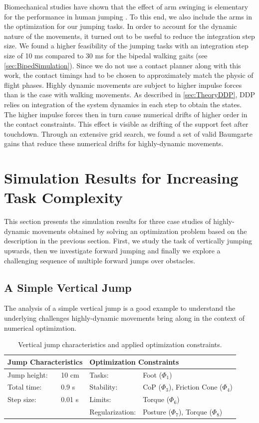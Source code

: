 Biomechanical studies have shown that the effect of arm swinging is elementary for the performance in human jumping \cite{harman1990effects}. To this end, we also include the arms in the optimization for our jumping tasks. 
In order to account for the dynamic nature of the movements, it turned out to be useful to reduce the integration step size. We found a higher feasibility of the jumping tasks with an integration step size of 10 ms compared to 30 ms for the bipedal walking gaits (see \cref{sec:BipedSimulation}). Since we do not use a contact planner along with this work, the contact timings had to be chosen to approximately match the physic of flight phases. 
Highly dynamic movements are subject to higher impulse forces than is the case with walking movements. As described in \ref{sec:TheoryDDP}, \gls{DDP} relies on integration of the system dynamics in each step to obtain the states. The higher impulse forces then in turn cause numerical drifts of higher order in the contact constraints. This effect is visible as drifting of the support feet after touchdown. Through an extensive grid search, we found a set of valid Baumgarte gains that reduce these numerical drifts for highly-dynamic movements.

\section{Simulation Results for Increasing Task Complexity}\label{sec:HighlySimulation}
This section presents the simulation results for three case studies of highly-dynamic movements obtained by solving an optimization problem based on the description in the previous section. First, we study the task of vertically jumping upwards, then we investigate forward jumping and finally we explore a challenging sequence of multiple forward jumps over obstacles.

\subsection{A Simple Vertical Jump}
The analysis of a simple vertical jump is a good example to understand the underlying challenges highly-dynamic movements bring along in the context of numerical optimization.

\begin{table}[t]
\centering
\caption{Vertical jump characteristics and applied optimization constraints.}
\begin{tabular}{|ll|ll|}
\hline
\multicolumn{2}{|l|}{\textbf{Jump Characteristics}} & \multicolumn{2}{l|}{\textbf{Optimization Constraints}} \\ \hline
Jump height:& 10 cm 	& Tasks: 			& Foot ($\Phi_1$) \\ \hline
Total time:& 0.9 s 		& Stability:    & \gls{CoP} ($\Phi_3$), Friction Cone ($\Phi_4$)\\ \hline
Step size:& 0.01 s 	& Limits: 			& Torque ($\Phi_6$)\\ \hline
& 					& Regularization: 	& Posture ($\Phi_7$), Torque ($\Phi_8$)\\ \hline
\end{tabular}
\label{tab:jumpVertical}
\end{table}

